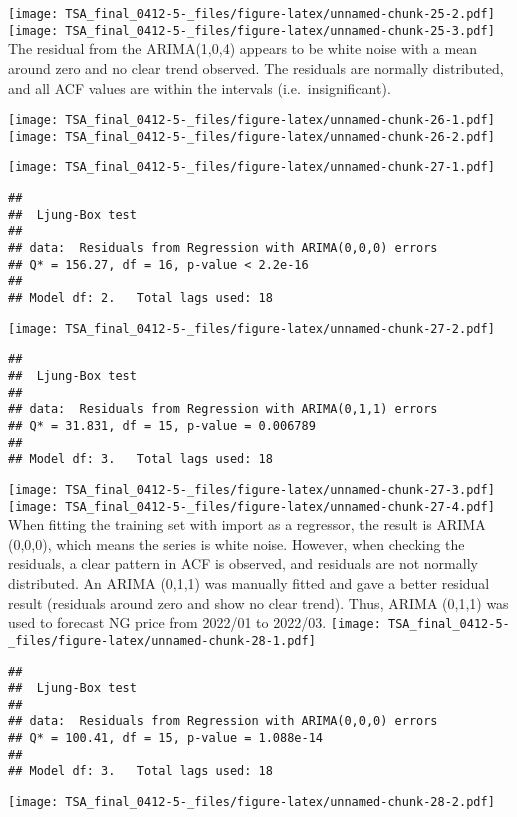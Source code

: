 \documentclass[
]{article}
\begin{document}
\texttt{[image: TSA\_final\_0412-5-\_files/figure-latex/unnamed-chunk-25-2.pdf]}
\texttt{[image: TSA\_final\_0412-5-\_files/figure-latex/unnamed-chunk-25-3.pdf]}
The residual from the ARIMA(1,0,4) appears to be white noise with a mean
around zero and no clear trend observed. The residuals are normally
distributed, and all ACF values are within the intervals
(i.e.~insignificant).

\texttt{[image: TSA\_final\_0412-5-\_files/figure-latex/unnamed-chunk-26-1.pdf]}
\texttt{[image: TSA\_final\_0412-5-\_files/figure-latex/unnamed-chunk-26-2.pdf]}

\texttt{[image: TSA\_final\_0412-5-\_files/figure-latex/unnamed-chunk-27-1.pdf]}

\begin{verbatim}
## 
##  Ljung-Box test
## 
## data:  Residuals from Regression with ARIMA(0,0,0) errors
## Q* = 156.27, df = 16, p-value < 2.2e-16
## 
## Model df: 2.   Total lags used: 18
\end{verbatim}

\texttt{[image: TSA\_final\_0412-5-\_files/figure-latex/unnamed-chunk-27-2.pdf]}

\begin{verbatim}
## 
##  Ljung-Box test
## 
## data:  Residuals from Regression with ARIMA(0,1,1) errors
## Q* = 31.831, df = 15, p-value = 0.006789
## 
## Model df: 3.   Total lags used: 18
\end{verbatim}

\texttt{[image: TSA\_final\_0412-5-\_files/figure-latex/unnamed-chunk-27-3.pdf]}
\texttt{[image: TSA\_final\_0412-5-\_files/figure-latex/unnamed-chunk-27-4.pdf]}
When fitting the training set with import as a regressor, the result is
ARIMA (0,0,0), which means the series is white noise. However, when
checking the residuals, a clear pattern in ACF is observed, and
residuals are not normally distributed. An ARIMA (0,1,1) was manually
fitted and gave a better residual result (residuals around zero and show
no clear trend). Thus, ARIMA (0,1,1) was used to forecast NG price from
2022/01 to 2022/03.
\texttt{[image: TSA\_final\_0412-5-\_files/figure-latex/unnamed-chunk-28-1.pdf]}

\begin{verbatim}
## 
##  Ljung-Box test
## 
## data:  Residuals from Regression with ARIMA(0,0,0) errors
## Q* = 100.41, df = 15, p-value = 1.088e-14
## 
## Model df: 3.   Total lags used: 18
\end{verbatim}

\texttt{[image: TSA\_final\_0412-5-\_files/figure-latex/unnamed-chunk-28-2.pdf]}
\end{document}

